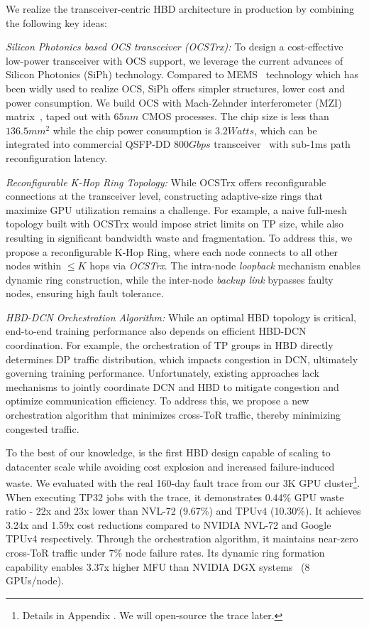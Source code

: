 We realize the transceiver-centric HBD architecture in production by combining the following key ideas: 
\begin{packeditemize}
    \item \emph{Silicon Photonics based OCS transceiver (OCSTrx):} To design a cost-effective low-power transceiver with OCS support, we leverage the current advances of Silicon Photonics (SiPh) technology. Compared to MEMS~\cite{urata2022missionapollo, mem-optical-switches} technology which has been widly used to realize OCS, SiPh offers simpler structures, lower cost and power consumption. We build OCS with Mach-Zehnder interferometer (MZI) matrix~\cite{mzi}, taped out with $65nm$ CMOS processes. The chip size is less than $136.5mm^2$ while the chip power consumption is $3.2Watts$, which can be integrated into commercial QSFP-DD $800Gbps$ transceiver~\cite{QSFP-DD} with sub-1ms path reconfiguration latency. 
    \item \emph{Reconfigurable K-Hop Ring Topology:} While OCSTrx offers reconfigurable connections at the transceiver level, constructing adaptive-size rings that maximize GPU utilization remains a challenge. For example, a naive full-mesh topology built with OCSTrx would impose strict limits on TP size, while also resulting in significant bandwidth waste and fragmentation. To address this, we propose a reconfigurable K-Hop Ring, where each node connects to all other nodes within $\le K$ hops via \textit{OCSTrx}. The intra-node \textit{loopback} mechanism enables dynamic ring construction, while the inter-node \textit{backup link} bypasses faulty nodes, ensuring high fault tolerance.
    
    \item \emph{HBD-DCN Orchestration Algorithm:} While an optimal HBD topology is critical, end-to-end training performance also depends on efficient HBD-DCN coordination. For example, the orchestration of TP groups in HBD directly determines DP traffic distribution, which impacts congestion in DCN, ultimately governing training performance. Unfortunately, existing approaches lack mechanisms to jointly coordinate DCN and HBD to mitigate congestion and optimize communication efficiency. To address this, we propose a new orchestration algorithm that minimizes cross-ToR traffic, thereby minimizing congested traffic.
\end{packeditemize}


To the best of our knowledge, \sys is the first HBD design capable of scaling to datacenter scale while avoiding cost explosion and increased failure-induced waste. We evaluated \sys \xspace with the real 160-day fault trace from our 3K GPU cluster\footnote{Details in Appendix . We will open-source the trace later.}. When executing TP32 jobs with the trace, it demonstrates 0.44\% GPU waste ratio - 22x and 23x lower than NVL-72 (9.67\%) and TPUv4 (10.30\%). It achieves 3.24x and 1.59x cost reductions compared to NVIDIA NVL-72 and Google TPUv4 respectively. Through the orchestration algorithm, it maintains near-zero cross-ToR traffic under 7\% node failure rates. Its dynamic ring formation capability enables 3.37x higher MFU than NVIDIA DGX systems~\cite{dgx} (8 GPUs/node). 
